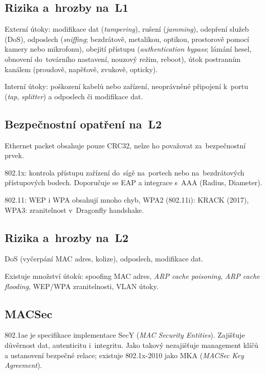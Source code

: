 \subsection{Rizika a~hrozby na~L1}

Externí útoky: modifikace dat (\emph{tampering}), rušení (\emph{jamming}), odepření služeb (DoS), odposlech (\emph{sniffing}; bezdrátově, metalikou, optikou, prostorově pomocí kamery nebo mikrofonu), obejití přístupu (\emph{authentication bypass}; lámání hesel, obnovení do~továrního nastavení, nouzový režim, reboot), útok postranním kanálem (proudově, napěťově, zvukově, opticky).

Interní útoky: poškození kabelů nebo zařízení, neoprávněné připojení k~portu (\emph{tap}, \emph{splitter}) a odposlech či modifikace dat.


\subsection{Bezpečnostní opatření na~L2}

Ethernet packet obsahuje pouze CRC32, nelze ho považovat za~bezpečnostní prvek.

802.1x: kontrola přístupu zařízení do~sígě na~portech nebo na~bezdrátových přístupových bodech.
Doporučuje se EAP a integrace s~AAA (Radius, Diameter).

802.11: WEP i WPA obsahují mnoho chyb, WPA2 (802.11i): KRACK (2017), WPA3: zranitelnost v~Dragonfly handshake.


\subsection{Rizika a~hrozby na~L2}

DoS (vyčerpání MAC adres, kolize), odposlech, modifikace dat.

Existuje množství útoků: spoofing MAC adres, \emph{ARP cache poisoning}, \emph{ARP cache flooding}, WEP/WPA zranitelnosti, VLAN útoky.



\subsection{MACSec}

802.1ae je specifikace implementace SecY (\emph{MAC Security Entities}).
Zajišťuje důvěrnost dat, autenticitu i~integritu.
Jako takový nezajišťuje management klíčů a ustanovení bezpečné relace; existuje 802.1x-2010 jako MKA (\emph{\mbox{MACSec} Key Agreement}).

